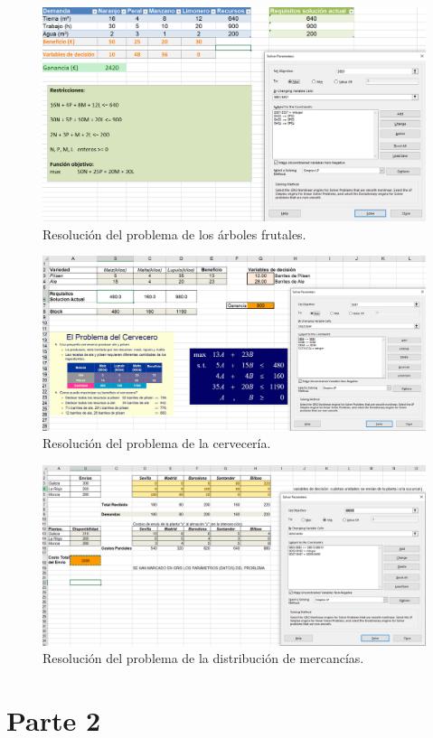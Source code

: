 \documentclass[13pt,a4paper]{article}
\begin{document}
\begin{figure}[H]\center\includegraphics[width=.95\linewidth]{img/solver.png}\caption{Resolución del problema de los árboles frutales.}\end{figure}

\begin{figure}[H]\center\includegraphics[width=.95\linewidth]{img/solver2.png}\caption{Resolución del problema de la cervecería.}\end{figure}

\begin{figure}[H]\center\includegraphics[width=.95\linewidth]{img/solver3.png}\caption{Resolución del problema de la distribución de mercancías.}\end{figure}

\section{Parte 2}

    \setlength{\parskip}{1em}
    
    
    \newpage
\end{document}
